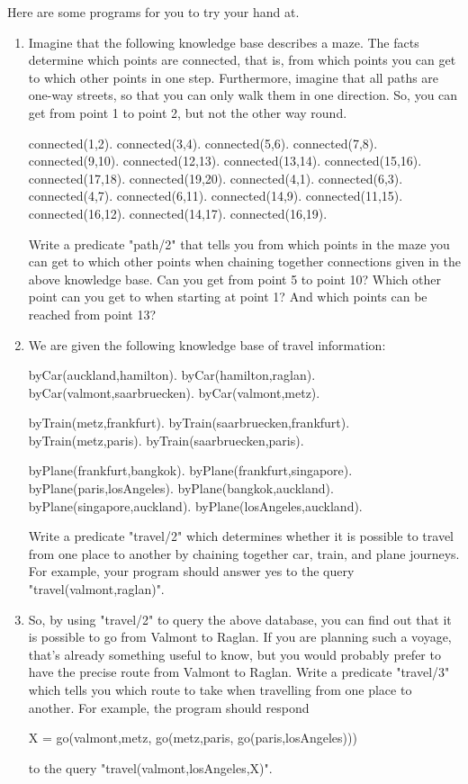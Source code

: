 Here are  some programs for you to try your hand at.
\begin{enumerate}
\item{}Imagine that the following knowledge base describes a maze. The facts
determine which points are connected, that is, from which points you can
get to which other points in one step. Furthermore, imagine that all
paths are one-way streets, so that you can only walk them in one
direction. So, you can get from point 1 to point 2, but not the other
way round.
\begin{LPNcodedisplay}
connected(1,2).
connected(3,4).
connected(5,6).
connected(7,8).
connected(9,10).
connected(12,13).
connected(13,14).
connected(15,16).
connected(17,18).
connected(19,20).
connected(4,1).
connected(6,3).
connected(4,7).
connected(6,11).
connected(14,9).
connected(11,15).
connected(16,12).
connected(14,17).
connected(16,19).
\end{LPNcodedisplay}

Write a predicate "path/2" that tells you from which points
in the maze you can get to which other points when chaining together
connections given in the above knowledge base. Can you get from point
5 to point 10? Which other point can you get to when starting at point
1? And which points can be reached from point 13?
\item{}We are given the following knowledge base of travel information:
\begin{LPNcodedisplay}
byCar(auckland,hamilton).
byCar(hamilton,raglan).
byCar(valmont,saarbruecken).
byCar(valmont,metz).

byTrain(metz,frankfurt).
byTrain(saarbruecken,frankfurt).
byTrain(metz,paris).
byTrain(saarbruecken,paris).

byPlane(frankfurt,bangkok).
byPlane(frankfurt,singapore).
byPlane(paris,losAngeles).
byPlane(bangkok,auckland).
byPlane(singapore,auckland).
byPlane(losAngeles,auckland).
\end{LPNcodedisplay}

Write a predicate "travel/2" which determines whether it is
possible to travel from one place to another by chaining together
car, train, and plane journeys. For example, your program should answer
yes to the query "travel(valmont,raglan)".

\item{}So, by using "travel/2" to query the above database, you can
find out that it is possible to go from Valmont to Raglan.  If you are
planning such a voyage, that's already something useful to know, but
you would probably prefer to have the precise route from Valmont to
Raglan.  Write a predicate "travel/3" which tells you which route to
take when travelling from one place to another.  For example, the
program should respond
\begin{LPNcodedisplay}
X = go(valmont,metz,
       go(metz,paris,
          go(paris,losAngeles)))
\end{LPNcodedisplay}
to the query
"travel(valmont,losAngeles,X)".


\end{enumerate}
